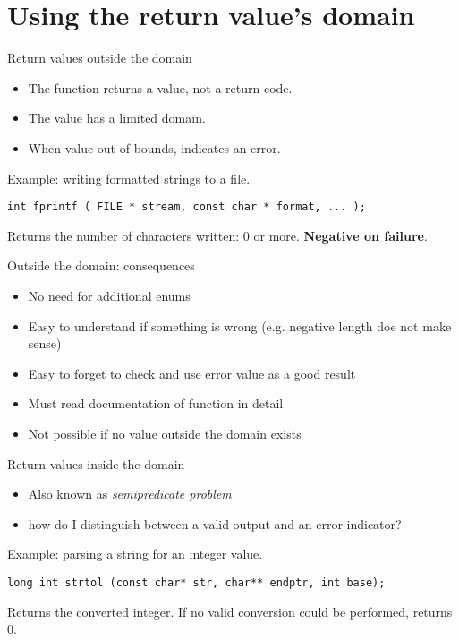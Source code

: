 \documentclass[aspectratio=169,14pt]{beamer}
\begin{document}
\section{Using the return value's domain}

\begin{frame}[fragile]{Return values outside the domain}

\begin{itemize}
    \item The function returns a value, not a return code.
    \item The value has a limited domain.
    \item When value out of bounds, indicates an error.
\end{itemize}

Example: writing formatted strings to a file.

\begin{lstlisting}[style=cstyle]
int fprintf ( FILE * stream, const char * format, ... );
\end{lstlisting}

Returns the number of characters written: 0 or more. \textbf{Negative on failure}. 
\end{frame}



\begin{frame}[fragile]{Outside the domain: consequences}
\begin{itemize}
    \item[\good] No need for additional enums
    \item[\good] Easy to understand if something is wrong (e.g. negative length doe not make sense)
    \item[\bad] Easy to forget to check and use error value as a good result
    \item[\bad] Must read documentation of function in detail 
    \item[\bad] Not possible if no value outside the domain exists
\end{itemize}
\end{frame}



\begin{frame}[fragile]{Return values inside the domain}
\begin{itemize}
    \item Also known as \textit{semipredicate problem}
    \item how do I distinguish between a valid output and an error indicator?
\end{itemize}

Example: parsing a string for an integer value.

\begin{lstlisting}[style=cstyle]
long int strtol (const char* str, char** endptr, int base);
\end{lstlisting}

Returns the converted integer. If no valid conversion could be performed, returns 0.
\end{frame}
\end{document}
